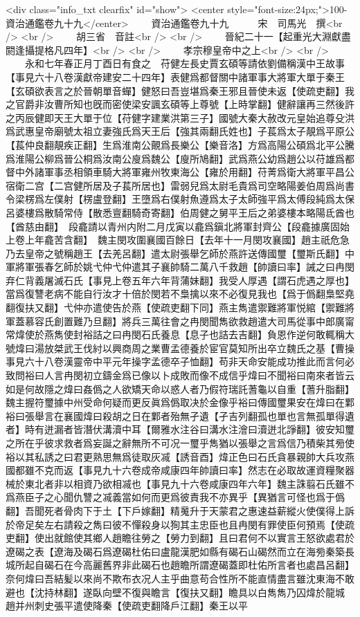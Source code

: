 <div class="info_txt clearfix" id="show">
<center style="font-size:24px;">100-資治通鑑卷九十九</center>
  　　資治通鑑卷九十九　　　宋　司馬光　撰<br />
<br />
　　胡三省　音註<br />
<br />
　　晉紀二十一【起重光大淵獻盡閼逢攝提格凡四年】<br />
<br />
　　孝宗穆皇帝中之上<br />
<br />
　　永和七年春正月丁酉日有食之　苻健左長史賈玄碩等請依劉備稱漢中王故事【事見六十八卷漢獻帝建安二十四年】表健爲都督關中諸軍事大將軍大單于秦王【玄碩欲表言之於晉朝單音蟬】健怒曰吾豈堪爲秦王邪且晉使未返【使疏吏翻】我之官爵非汝曹所知也旣而密使梁安諷玄碩等上尊號【上時掌翻】健辭讓再三然後許之丙辰健即天王大單于位【苻健字建業洪第三子】國號大秦大赦改元皇始追尊殳洪爲武惠皇帝廟號太祖立妻強氏爲天王后【強其兩翻氏姓也】子萇爲太子靚爲平原公【萇仲良翻靚疾正翻】生爲淮南公覿爲長樂公【樂音洛】方爲高陽公碩爲北平公騰爲淮陽公柳爲晉公桐爲汝南公廋爲魏公【廋所鳩翻】武爲燕公幼爲趙公以苻雄爲都督中外諸軍事丞相領車騎大將軍雍州牧東海公【雍於用翻】苻菁爲衛大將軍平昌公宿衛二宫【二宫健所居及子萇所居也】雷弱兒爲太尉毛貴爲司空略陽姜伯周爲尚書令梁楞爲左僕射【楞盧登翻】王墮爲右僕射魚遵爲太子太師強平爲太傅段純爲太保呂婆樓爲散騎常侍【散悉亶翻騎奇寄翻】伯周健之舅平王后之弟婆樓本略陽氐酋也【酋慈由翻】　段龕請以青州内附二月戊寅以龕爲鎭北將軍封齊公【段龕據廣固始上卷上年龕苦含翻】　魏主閔攻圍襄國百餘日【去年十一月閔攻襄國】趙主祇危急乃去皇帝之號稱趙王【去羌呂翻】遣太尉張舉乞師於燕許送傳國璽【璽斯氏翻】中軍將軍張春乞師於姚弋仲弋仲遣其子襄帥騎二萬八千救趙【帥讀曰率】誡之曰冉閔弃仁背義屠滅石氏【事見上卷五年六年背蒲妹翻】我受人厚遇【謂石虎遇之厚也】當爲復讐老病不能自行汝才十倍於閔若不梟擒以來不必復見我也【爲于僞翻梟堅堯翻復扶又翻】弋仲亦遣使告於燕【使疏吏翻下同】燕主雋遣禦難將軍悦綰【禦難將軍蓋慕容氏創置難乃旦翻】將兵三萬往會之冉閔聞雋欲救趙遣大司馬從事中郎廣甯常煒使於燕雋使封裕詰之曰冉閔石氏養息【息子也詰去吉翻】負恩作逆何敢輒稱大號煒曰湯放桀武王伐紂以興商周之業曹孟德養於宦官莫知所出卒立魏氏之基【曹操事見六十八卷漢靈帝中平元年操字孟德卒子恤翻】苟非天命安能成功推此而言何必致問裕曰人言冉閔初立鑄金爲已像以卜成敗而像不成信乎煒曰不聞裕曰南來者皆云如是何故隱之煒曰姦僞之人欲矯天命以惑人者乃假符瑞託蓍龜以自重【蓍升脂翻】魏主握符璽據中州受命何疑而更反眞爲僞取决於金像乎裕曰傳國璽果安在煒曰在鄴裕曰張舉言在襄國煒曰殺胡之日在鄴者殆無孑遺【孑吉列翻孤也單也言無孤單得遺者】時有迸漏者皆潛伏溝瀆中耳【爾雅水注谷曰溝水注澮曰瀆迸北諍翻】彼安知璽之所在乎彼求救者爲妄誕之辭無所不可况一璽乎雋猶以張舉之言爲信乃積柴其㫄使裕以其私誘之曰君更熟思無爲徒取灰㓕【誘音酉】煒正色曰石氏貪暴親帥大兵攻燕國都雖不克而返【事見九十六卷成帝咸康四年帥讀曰率】然志在必取故運資糧聚器械於東北者非以相資乃欲相㓕也【事見九十六卷咸康四年六年】魏主誅翦石氏雖不爲燕臣子之心聞仇讐之㓕義當如何而更爲彼責我不亦異乎【異猶言可怪也爲于僞翻】吾聞死者骨肉下于土【下戶嫁翻】精䰟升于天蒙君之惠速益薪縱火使僕得上訴於帝足矣左右請殺之雋曰彼不憚殺身以狥其主忠臣也且冉閔有罪使臣何預焉【使疏吏翻】使出就館使其鄉人趙瞻往勞之【勞力到翻】且曰君何不以實言王怒欲處君於遼碣之表【遼海及碣石爲遼碣杜佑曰盧龍漢肥如縣有碣石山碣然而立在海㫄秦築長城所起自碣石在今高麗舊界非此碣石也趙瞻所謂遼碣蓋即杜佑所言者也處昌呂翻】奈何煒曰吾結髪以來尚不欺布衣况人主乎曲意苟合性所不能直情盡言雖沈東海不敢避也【沈持林翻】遂臥向壁不復與瞻言【復扶又翻】瞻具以白雋雋乃囚煒於龍城　趙并州刺史張平遣使降秦【使疏吏翻降戶江翻】秦王以平